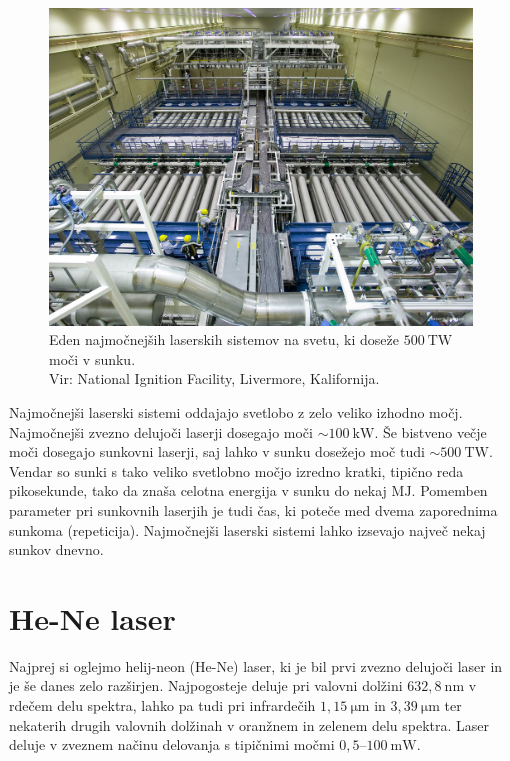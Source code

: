 \begin{figure}[h!]
\centering
\includegraphics[width=100truemm]{slike/07_NIF_Laser_Bay.jpg}
\caption{Eden najmočnejših laserskih sistemov na svetu, ki doseže 
$500~\si{\tera\watt}$ moči v sunku. \\Vir: National Ignition Facility, Livermore, Kalifornija.}
\label{fig:NIF}
\end{figure}

Najmočnejši laserski sistemi oddajajo svetlobo z zelo veliko izhodno močj. 
Najmočnejši zvezno delujoči laserji dosegajo moči 
$\sim 100~\si{\kilo\watt}$. Še bistveno večje moči dosegajo sunkovni laserji, 
saj lahko v sunku dosežejo moč tudi $\sim 500~\si{\tera\watt}$. 
Vendar so sunki s tako veliko svetlobno močjo izredno kratki, tipično reda pikosekunde, tako da
znaša celotna energija v sunku do nekaj $\si{\mega\joule}$. Pomemben
parameter pri sunkovnih laserjih je tudi čas, ki poteče med dvema zaporednima
sunkoma (repeticija). Najmočnejši laserski sistemi lahko izsevajo največ nekaj sunkov dnevno. 

\section{He-Ne laser}
Najprej si oglejmo helij-neon (He-Ne) laser, ki je bil prvi zvezno 
delujoči laser in je še danes zelo razširjen. Najpogosteje deluje 
pri valovni dolžini $632,8~\si{\nano\metre}$ v rdečem delu spektra, lahko 
pa tudi pri infrardečih $1,15~\si{\micro\metre}$ in 
$3,39~\si{\micro\metre}$ ter nekaterih drugih
valovnih dolžinah v oranžnem in zelenem delu spektra. Laser deluje v zveznem 
načinu delovanja s tipičnimi močmi $0,5$--$100~\si{\milli\watt}$.

